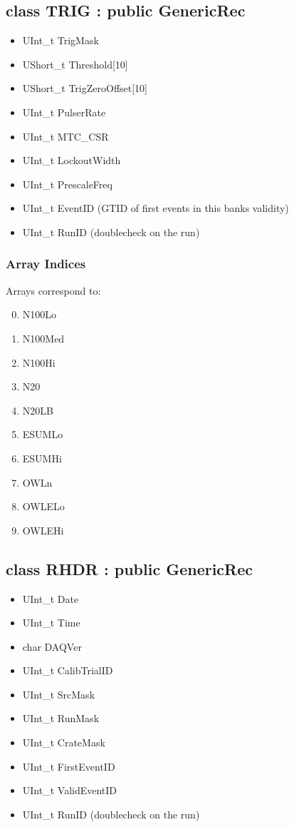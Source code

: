 \documentclass{article}
\begin{document}
\subsection{class TRIG : public GenericRec}
\begin{itemize}
\item UInt\_t TrigMask
\item UShort\_t Threshold[10]
\item UShort\_t TrigZeroOffset[10]
\item UInt\_t PulserRate
\item UInt\_t MTC\_CSR
\item UInt\_t LockoutWidth
\item UInt\_t PrescaleFreq
\item UInt\_t EventID (GTID of first events in this banks validity)
\item UInt\_t RunID (doublecheck on the run)
\end{itemize}

\subsubsection{Array Indices}
Arrays correspond to:
\begin{enumerate}
\setcounter{enumi}{-1}
\item N100Lo
\item N100Med
\item N100Hi
\item N20
\item N20LB
\item ESUMLo
\item ESUMHi
\item OWLn
\item OWLELo
\item OWLEHi
\end{enumerate}

\subsection{class RHDR : public GenericRec}
\begin{itemize}
\item UInt\_t Date
\item UInt\_t Time
\item char DAQVer
\item UInt\_t CalibTrialID
\item UInt\_t SrcMask
\item UInt\_t RunMask
\item UInt\_t CrateMask
\item UInt\_t FirstEventID
\item UInt\_t ValidEventID
\item UInt\_t RunID (doublecheck on the run)
\end{itemize}
\end{document}
